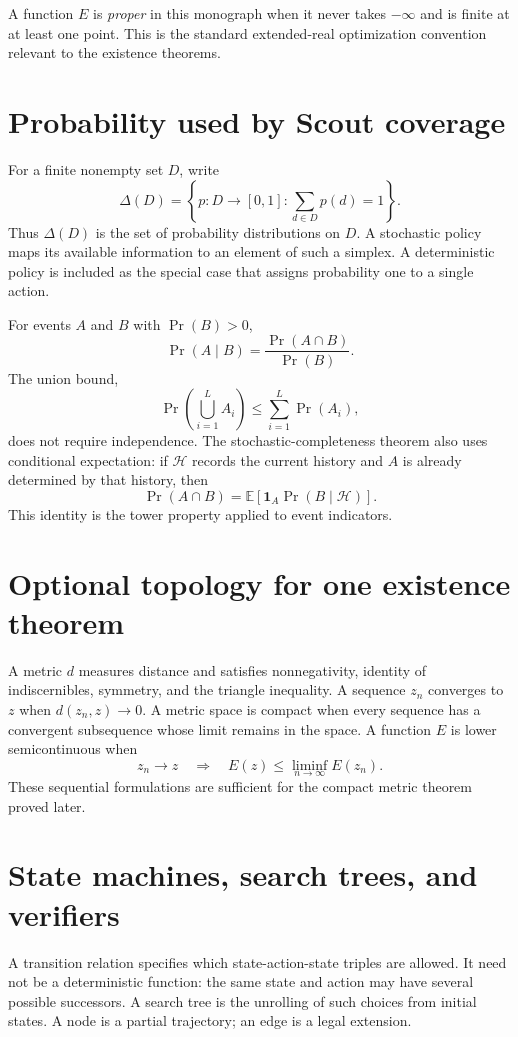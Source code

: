 \documentclass[11pt,oneside]{book}
\theoremstyle{remark}
\newcommand{\one}{\mathbf 1}
\begin{document}
A function $E$ is \emph{proper} in this monograph when it never takes
$-\infty$ and is finite at at least one point. This is the standard
extended-real optimization convention relevant to the existence theorems.

\section*{Probability used by Scout coverage}

For a finite nonempty set $D$, write
\[
\Delta(D)
=\left\{p:D\to[0,1]:\sum_{d\in D}p(d)=1\right\}.
\]
Thus $\Delta(D)$ is the set of probability distributions on $D$. A
stochastic policy maps its available information to an element of such a
simplex. A deterministic policy is included as the special case that assigns
probability one to a single action.

For events $A$ and $B$ with $\Pr(B)>0$,
\[
\Pr(A\mid B)=\frac{\Pr(A\cap B)}{\Pr(B)}.
\]
The union bound,
\[
\Pr\!\left(\bigcup_{i=1}^L A_i\right)
\le\sum_{i=1}^L\Pr(A_i),
\]
does not require independence. The stochastic-completeness theorem also uses
conditional expectation: if $\mathcal H$ records the current history and
$A$ is already determined by that history, then
\[
\Pr(A\cap B)
=\mathbb E\!\left[\one_A\Pr(B\mid\mathcal H)\right].
\]
This identity is the tower property applied to event indicators.

\section*{Optional topology for one existence theorem}

A metric $d$ measures distance and satisfies nonnegativity, identity of
indiscernibles, symmetry, and the triangle inequality. A sequence $z_n$
converges to $z$ when $d(z_n,z)\to0$. A metric space is compact when every
sequence has a convergent subsequence whose limit remains in the space. A
function $E$ is lower semicontinuous when
\[
z_n\to z
\quad\Longrightarrow\quad
E(z)\le\liminf_{n\to\infty}E(z_n).
\]
These sequential formulations are sufficient for the compact metric theorem
proved later.

\section*{State machines, search trees, and verifiers}

A transition relation specifies which state-action-state triples are allowed.
It need not be a deterministic function: the same state and action may have
several possible successors. A search tree is the unrolling of such choices
from initial states. A node is a partial trajectory; an edge is a legal
extension.
\end{document}
